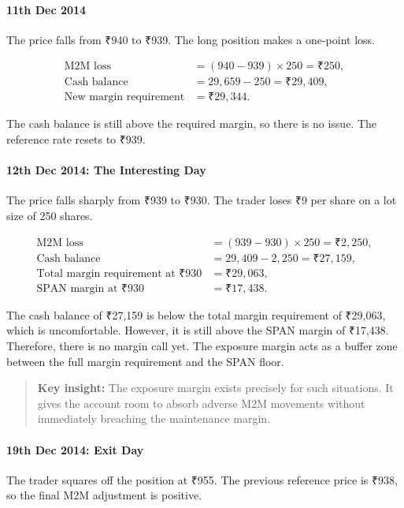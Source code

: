 \documentclass[12pt,openany]{book}
\begin{document}
\paragraph{11th Dec 2014}
The price falls from ₹940 to ₹939. The long position makes a one-point loss.

\begin{align*}
\text{M2M loss} &= (940 - 939) \times 250 = \text{₹}250, \\
\text{Cash balance} &= 29{,}659 - 250 = \text{₹}29{,}409, \\
\text{New margin requirement} &= \text{₹}29{,}344.
\end{align*}

The cash balance is still above the required margin, so there is no issue. The reference rate resets to ₹939.

\paragraph{12th Dec 2014: The Interesting Day}
The price falls sharply from ₹939 to ₹930. The trader loses ₹9 per share on a lot size of 250 shares.

\begin{align*}
\text{M2M loss} &= (939 - 930) \times 250 = \text{₹}2{,}250, \\
\text{Cash balance} &= 29{,}409 - 2{,}250 = \text{₹}27{,}159, \\
\text{Total margin requirement at ₹930} &= \text{₹}29{,}063, \\
\text{SPAN margin at ₹930} &= \text{₹}17{,}438.
\end{align*}

The cash balance of ₹27,159 is below the total margin requirement of ₹29,063, which is uncomfortable. However, it is still above the SPAN margin of ₹17,438. Therefore, there is no margin call yet. The exposure margin acts as a buffer zone between the full margin requirement and the SPAN floor.

\begin{quote}
\textbf{Key insight:} The exposure margin exists precisely for such situations. It gives the account room to absorb adverse M2M movements without immediately breaching the maintenance margin.
\end{quote}

\paragraph{19th Dec 2014: Exit Day}
The trader squares off the position at ₹955. The previous reference price is ₹938, so the final M2M adjustment is positive.
\end{document}
